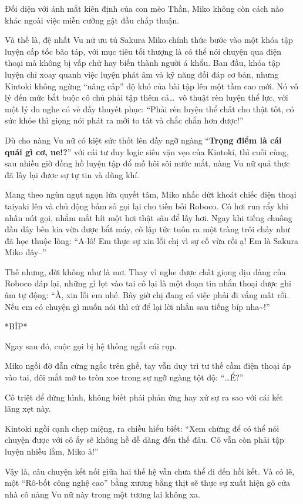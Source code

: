 \documentclass[../main.tex]{subfiles}
\begin{document}
Đối diện với ánh mắt kiên định của con mèo Thần, Miko không còn cách nào khác ngoài việc miễn cưỡng gật đầu chấp thuận.

\ct

Và thế là, đệ nhất Vu nữ ưu tú Sakura Miko chính thức bước vào một khóa tập luyện cấp tốc bão táp, với mục tiêu tối thượng là có thể nói chuyện qua điện thoại mà không bị vấp chữ hay biến thành người á khẩu. Ban đầu, khóa tập luyện chỉ xoay quanh việc luyện phát âm và kỹ năng đối đáp cơ bản, nhưng Kintoki không ngừng ``nâng cấp'' độ khó của bài tập lên một tầm cao mới. Nó vô lý đến mức bắt buộc cô chủ phải tập thêm cả\dots\ võ thuật rèn luyện thể lực, với một lý do nghe có vẻ đầy thuyết phục: ``Phải rèn luyện thể chất cho thật tốt, có sức khỏe thì giọng nói phát ra mới to tát và chắc chắn hơn được!''

Dù cho nàng Vu nữ có kiệt sức thốt lên đầy ngỡ ngàng ``\textbf{Trọng điểm là cái quái gì cơ, ne!?}'' với cái tư duy logic siêu vặn vẹo của Kintoki, thì cuối cùng, sau nhiều giờ đồng hồ luyện tập đổ mồ hôi sôi nước mắt, nàng Vu nữ quả thực đã lấy lại được sự tự tin và dũng khí.

\ct

Mang theo ngùn ngụt ngọn lửa quyết tâm, Miko nhấc dứt khoát chiếc điện thoại taiyaki lên và chủ động bấm số gọi lại cho tiền bối Roboco. Cô hơi run rẩy khi nhấn nút gọi, nhắm mắt hít một hơi thật sâu để lấy hơi. Ngay khi tiếng chuông đầu dây bên kia vừa được bắt máy, cô lập tức tuôn ra một tràng trôi chảy như đã học thuộc lòng: ``A-lô! Em thực sự xin lỗi chị vì sự cố vừa rồi ạ! Em là Sakura Miko đây--''

Thế nhưng, đời không như là mơ. Thay vì nghe được chất giọng dịu dàng của Roboco đáp lại, những gì lọt vào tai cô lại là một đoạn tin nhắn thoại được ghi âm tự động: ``À, xin lỗi em nhé. Bây giờ chị đang có việc phải đi vắng mất rồi. Nếu em có chuyện gì muốn nói thì cứ để lại lời nhắn sau tiếng bíp nha\~{}!''

*BÍP*

Ngay sau đó, cuộc gọi bị hệ thống ngắt cái rụp.

Miko ngồi đờ đẫn cứng ngắc trên ghế, tay vẫn duy trì tư thế cầm điện thoại áp vào tai, đôi mắt mở to tròn xoe trong sự ngỡ ngàng tột độ: ``\dots Ể?''

Cô triệt để đứng hình, không biết phải phản ứng hay xử sự ra sao với cái kết lãng xẹt này.


Kintoki ngồi cạnh chẹp miệng, ra chiều hiểu biết: ``Xem chừng để có thể nói chuyện được với cô ấy sẽ không hề dễ dàng đến thế đâu. Cô vẫn còn phải tập luyện nhiều lắm, Miko à!''

Vậy là, câu chuyện kết nối giữa hai thế hệ vẫn chưa thể đi đến hồi kết. Và có lẽ, một ``Rô-bốt công nghệ cao'' bằng xương bằng thịt sẽ thực sự xuất hiện gõ cửa nhà cô nàng Vu nữ này trong một tương lai không xa.
\end{document}
